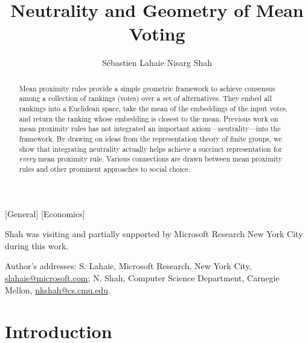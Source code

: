 \documentclass[prodmode]{acmsmall-ec14}
\begin{document}

\title{Neutrality and Geometry of Mean Voting}
\author{
S\'{e}bastien Lahaie
Nisarg Shah
}

\begin{abstract}
Mean proximity rules provide a simple geometric framework to achieve consensus among a collection of rankings (votes) over a set of alternatives. They embed all rankings into a Euclidean space, take the mean of the embeddings of the input votes, and return the ranking whose embedding is closest to the mean. Previous work on mean proximity rules has not integrated an important axiom---neutrality---into the framework. By drawing on ideas from the representation theory of finite groups, we show that integrating neutrality actually helps achieve a succinct representation for \emph{every} mean proximity rule. Various connections are drawn between mean proximity rules and other prominent approaches to social choice.
\end{abstract}

[General]
[Economics]




\begin{bottomstuff}
Shah was visiting and partially supported by Microsoft Research New York City during this work.

Author's addresses:  S. Lahaie, Microsoft Research, New York City, \url{slahaie@microsoft.com}; N. Shah, Computer Science Department, Carnegie Mellon, \url{nkshah@cs.cmu.edu}.
\end{bottomstuff}

\maketitle
\section{Introduction}
\label{sec:intro}
\end{document}
